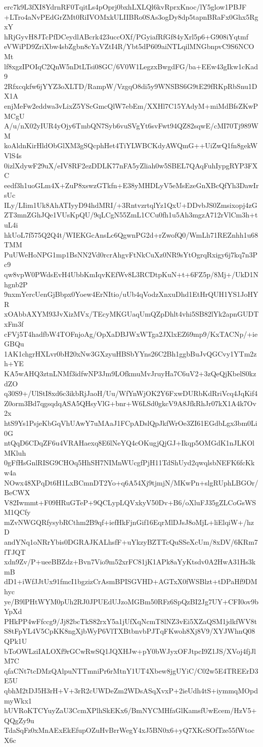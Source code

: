 erc7k9L3fXI8YdrnRF0TqitLs4pOprj0bxhLXLQl6kvRprxKnoc/lY5glow1PBJF
+LTro4aNvPEdGrZMt0RiIVOMxkULIIBRo0SAs3ogDy8dp5tapnBRaFx0Ghx5RgxY
hRjGyvH8JTcPfDCeydlABcrk423uccOXf/PGyiafRfGf84yXrl5p6+G908iYqtmf
eVWiPD9ZriXbw4sbZgbn8cYaVZtI4R/Ybt5dP609aiNTLqilMNGbnpvC9S6NCOMt
lf8xgzIPOIqC2QnW5nDtLTsi08GC/6V0W1LegzxBwgdFG/ba+EEw43gIkw1cKad9
2Rfxcqkfw6jYYZ3oXLTD/RampW/VzgqO8di5y9WNSBS6G9tE29fRKpRbSnu1DX1A
enjMeFw2eddwa3vLixZ5YScGmcQlW7ebEm/XXHl7C15YAdyM+miMdBfsZKwPMCgU
A/u/nX02yIUR4yOjy6TmbQN7Syb6vuSVgYt6svFwt94QZ82sqwE/cMI70Tj989WM
koAldnKirHldObGlXM3gSQcphHet4TiYLWBCKdyAWQmG++UiZwQ1fn8gekWVlS4s
0izlXdywF29uX/eIV8RF2ezDDLK77nFA5yZliah0w5SBEL7QAqFuhIypgRYP3FXC
eedf3h1uoGLm4X+ZuP8xswzGTkfn+E38yMHDLyV5eMsEzeGnXBcQfYh3DawIrsUc
ILy/LIim1Uk8AhATIyyD94hdMRI/+3RntvzrtqlYz1QxU+DDvbJS0Zmsixopj4zG
ZT3mnZGhJQe1VUsKpQU/9qLCgN55ZmL1CCu0fh1u5Ah3mgzA712rVlCm3h+tuL4i
hkUoL7f575Q2Q4t/WIEKGcAnsLc6QgwnPG2d+rZwofQ0/WmLh71REZnhh1u68TMM
PuUWeHoNPG1mp1BsNN2Vd0rcrAhgvFtNkCuXz0NR9sYtOgrqRxigy6j7kq7n3Pc9
qw8vpW0PWdsEvH4UbbKmIqvKEfWv8L3RCDtpKuN+t+6FZ5p/8Mj+/UkD1Nhgnb2P
9nxmYercUenGjBbpx0Yoew4ErNItio/uUb4qVodzXnxuDhd1EtHrQUH1YS1JoHYR
xOAbbAXYM93JvXizMVx/TEcyMKGUaqUmQZpDhlt4vhi5SB82lYk2apnGUDTxFm3f
cFVj5T4hadfbW4TOFnjoAg/OpXaDBJWxWTga2JXlxEZ69mp9/KxTACNp/+ieGBQu
1AK1chgrHXLvr0bH20xNw3GXzyuHBSbYYns26C2Bh1ggbBuJvQGCvy1YTm2zh+YE
KA5wAHQ3ztnLNMf3idfwNP3Jm9LOfkmuMvJruyHa7C6uV2+3zQeQjKbelS0kzdZO
q30S9+/UlStI8xd6c3ikbRjJaoH/Uu/WfYnWjOK2Y6FxwDURbKdRriVcq4JqKif4
Z0orm3Bd7qgsqdqASA5QHsyVlG+bnr+W6LSd0gkcV9A8JfkRhJr07kX1A4k7Ov2x
htS9Ys1PsjeKbGqVhUAwY7uMAaJ1FCpADslQpJkfWrOe3ZI61EGdbLgx3bm0Li0G
ntQqD6CDqZF6u4VRAHaexq8E6lNeYQ4cOKugjQjGJ+Ikqp5OMGdK1nJLKOlMKluh
0gFfHsGnlRISG9CHOq5HhSH7NIMnWUcgfPjH11TdShUyd2qwqlsbNEFK6fcKkw4a
NOwx48XPqDt6H1LxBCmnDT2Yo+q6A54Xj9tjmjN/MKwPn+slgRUphLBGOr/BeCWX
V82Iwmmt+F09HRuGTeP+9QCLypLQVxkyV50Dv+B6/oXluFJ35gZLCoGsWSM1QCfy
mZvNWGQRfysybRCthm2B9qf+iefHkFjnGif16EqrMlDJsJ8oMjL+liElqiW+/hzD
andYNq1oNRrYbis0DGRAJKALhsfF+uYkzyBZTTcQuSSeXcUm/8xDV/6KRm7fTJQT
xdn9Zv/P+ueeBBZdz+Bvn7Vio9m52xrFC81jK1APk8aYyKtsdv0A2HwA31Hs3kmB
dD1+iWfJJtUx91fmcI1bgzizCrAsmBPISGVHD+AGTxX0fWSBlzt+tDPaHf9DMhyc
ye/B9lPHtWYM0pUh2RJ0JPUEdUJzoMGBm50RFz6SpQzBI2Jg7UY+CFI0ov9bYpXd
PHkPP4wFfccg9/Jj82bcTkS82rxY5a1jUfXqNcmT8lNZ3vEi5XZaQSM1jdkfWV8t
S8tFpYL4V5CpKK8ngXjbWyP6VlTXBtbnvbPJTqFKwoh8Xj8V9/XYJWhnQ08QPk1U
bToOWLziIALOXf9rGCwRwSQ1JQXHJw+pY0bWJyxOFJtpcI9Z1JS/XVoj4fjJlM7C
qfaCNt7tcDMzQAlpuNTTmniPr6rMtnY1UT4Xbew8jgUYiC/C02w5E4TREErD3E5U
qbhM2tDJ5H3rH+V+3rR2cUWDeZm2WDsASqXvxP+2ieUdh4tS+iymmqMOpdmyWkx1
hUVRoKTCYuyZaU3CcmXPlhSkEKx6/BmNYCMHfaGlKamsfUwEcem/HzV5+QQgZy9u
TdaSqFz0xMnAExEkEfupOZuHvBrrWegY4xJ5BN0x6+yQ7XKcSOfTze55fWtocX6c
